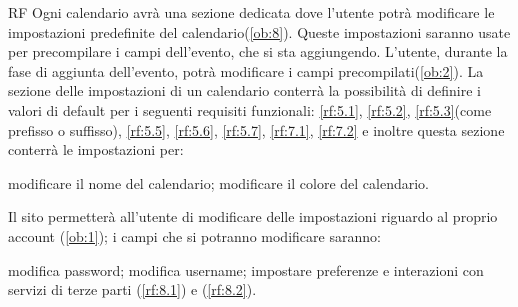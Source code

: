 \begin{listaPersonale}{RF}
	 Ogni calendario avrà una sezione dedicata dove l'utente potrà modificare le impostazioni predefinite del calendario(\ref{ob:8}). Queste impostazioni saranno usate per precompilare i campi dell'evento, che si sta aggiungendo. L'utente, durante la fase di aggiunta dell'evento, potrà modificare i campi precompilati(\ref{ob:2}). La sezione delle impostazioni di un calendario conterrà la possibilità di definire i valori di default per i seguenti requisiti funzionali: \ref{rf:5.1}, \ref{rf:5.2}, \ref{rf:5.3}(come prefisso o suffisso), \ref{rf:5.5}, \ref{rf:5.6}, \ref{rf:5.7}, \ref{rf:7.1}, \ref{rf:7.2} e inoltre questa sezione conterrà le impostazioni per:
	\begin{listaPersonale2}{}
		 modificare il nome del calendario;
		 modificare il colore del calendario.
	\end{listaPersonale2}

	 Il sito permetterà all'utente di modificare delle impostazioni riguardo al proprio account (\ref{ob:1}); i campi che si potranno modificare saranno:
	\begin{listaPersonale2}{}
		 modifica password;
		 modifica username;
		 impostare preferenze e interazioni con servizi di terze parti (\ref{rf:8.1}) e (\ref{rf:8.2}).
	\end{listaPersonale2}
\end{listaPersonale}